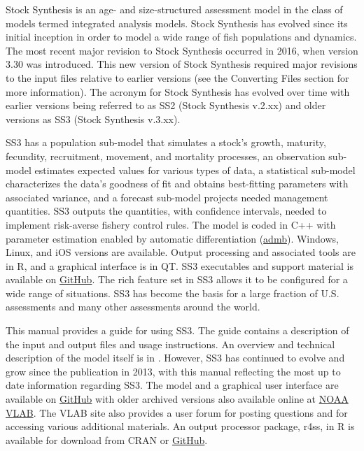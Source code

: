 Stock Synthesis is an age- and size-structured assessment model in the class of models termed integrated analysis models. Stock Synthesis has evolved since its initial inception in order to model a wide range of fish populations and dynamics.  The most recent major revision to Stock Synthesis occurred in 2016, when version 3.30 was introduced. This new version of Stock Synthesis required major revisions to the input files relative to earlier versions (see the \hypertarget{ConvIssues}{Converting Files} section for more information). The acronym for Stock Synthesis has evolved over time with earlier versions being referred to as SS2 (Stock Synthesis v.2.xx) and older versions as SS3 (Stock Synthesis v.3.xx). 

SS3 has a population sub-model that simulates a stock's growth, maturity, fecundity, recruitment, movement, and mortality processes, an observation sub-model estimates expected values for various types of data, a statistical sub-model characterizes the data’s goodness of fit and obtains best-fitting parameters with associated variance, and a forecast sub-model projects needed management quantities.  SS3 outputs the quantities, with confidence intervals, needed to implement risk-averse fishery control rules. The model is coded in C++ with parameter estimation enabled by automatic differentiation (\href{http://www.admb-project.org}{admb}). Windows, Linux, and iOS versions are available.  Output processing and associated tools are in R, and a graphical interface is in QT.  SS3 executables and support material is available on \href{https://github.com/nmfs-stock-synthesis}{GitHub}. The rich feature set in SS3 allows it to be configured for a wide range of situations.  SS3 has become the basis for a large fraction of U.S. assessments and many other assessments around the world.  

This manual provides a guide for using SS3. The guide contains a description of the input and output files and usage instructions. An overview and technical description of the model itself is in \citet{methotstock2013}. However, SS3 has continued to evolve and grow since the publication in 2013, with this manual reflecting the most up to date information regarding SS3.  The model and a graphical user interface are available on \href{https://github.com/nmfs-stock-synthesis}{GitHub} with older archived versions also available online at \href{https://vlab.noaa.gov/web/stock-synthesis}{NOAA VLAB}. The VLAB site also provides a user forum for posting questions and for accessing various additional materials. An output processor package, r4ss, in R is available for download from CRAN or \href{https://github.com/r4ss/r4ss}{GitHub}.

